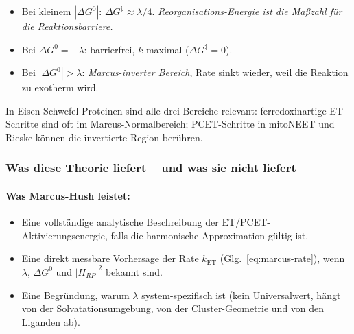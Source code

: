 \documentclass[11pt,a4paper,twoside]{article}
\theoremstyle{remark}
\begin{document}
\begin{itemize}\setlength{\itemsep}{0pt}
  \item Bei kleinem $|\Delta G^0|$: $\Delta G^\ddagger \approx
        \lambda/4$. \emph{Reorganisations-Energie ist die Ma{\ss}zahl
        f\"ur die Reaktionsbarriere.}
  \item Bei $\Delta G^0 = -\lambda$: barrierfrei, $k$ maximal
        ($\Delta G^\ddagger = 0$).
  \item Bei $|\Delta G^0| > \lambda$: \emph{Marcus-inverter Bereich},
        Rate sinkt wieder, weil die Reaktion zu exotherm wird.
\end{itemize}

In Eisen-Schwefel-Proteinen sind alle drei Bereiche relevant:
ferredoxinartige ET-Schritte sind oft im Marcus-Normalbereich;
PCET-Schritte in mitoNEET und Rieske k\"onnen die invertierte Region
ber\"uhren.

\subsubsection*{Was diese Theorie liefert -- und was sie nicht liefert}

\paragraph{Was Marcus-Hush leistet:}
\begin{itemize}\setlength{\itemsep}{0pt}
  \item Eine vollst\"andige analytische Beschreibung der
        ET/PCET-Aktivierungsenergie, falls die harmonische
        Approximation g\"ultig ist.
  \item Eine direkt messbare Vorhersage der Rate $k_\text{ET}$
        (Glg.~\ref{eq:marcus-rate}), wenn $\lambda$, $\Delta G^0$
        und $|H_{RP}|^2$ bekannt sind.
  \item Eine Begr\"undung, warum $\lambda$ system-spezifisch ist
        (kein Universalwert, h\"angt von der Solvatationsumgebung,
        von der Cluster-Geometrie und von den Liganden ab).
\end{itemize}
\end{document}
